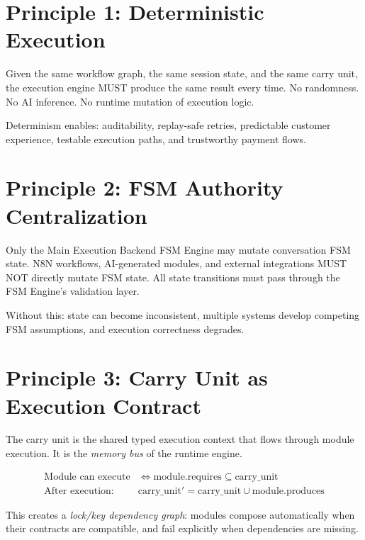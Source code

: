 \documentclass[12pt, a4paper]{report}
\newenvironment{invariantbox}[1]{%
  \begin{tcolorbox}[
    colback=red!4!white,
    colframe=warningred,
    title={\textbf{INVARIANT: #1}},
    fonttitle=\small\bfseries
  ]
}{%
  \end{tcolorbox}
}
\newenvironment{principlebox}[1]{%
  \begin{tcolorbox}[
    colback=blue!4!white,
    colframe=primaryblue,
    title={\textbf{PRINCIPLE: #1}},
    fonttitle=\small\bfseries
  ]
}{%
  \end{tcolorbox}
}
\begin{document}
\section{Principle 1: Deterministic Execution}

\begin{principlebox}{Determinism}
Given the same workflow graph, the same session state, and the same carry unit, the execution engine MUST produce the same result every time. No randomness. No AI inference. No runtime mutation of execution logic.
\end{principlebox}

Determinism enables: auditability, replay-safe retries, predictable customer experience, testable execution paths, and trustworthy payment flows.

\section{Principle 2: FSM Authority Centralization}

\begin{invariantbox}{FSM Authority}
Only the Main Execution Backend FSM Engine may mutate conversation FSM state. N8N workflows, AI-generated modules, and external integrations MUST NOT directly mutate FSM state. All state transitions must pass through the FSM Engine's validation layer.
\end{invariantbox}

Without this: state can become inconsistent, multiple systems develop competing FSM assumptions, and execution correctness degrades.

\section{Principle 3: Carry Unit as Execution Contract}

The carry unit is the shared typed execution context that flows through module execution. It is the \textit{memory bus} of the runtime engine.

\begin{align}
\text{Module can execute} &\iff \text{module.requires} \subseteq \text{carry\_unit} \\
\text{After execution:} \quad & \text{carry\_unit}' = \text{carry\_unit} \cup \text{module.produces}
\end{align}

This creates a \textit{lock/key dependency graph}: modules compose automatically when their contracts are compatible, and fail explicitly when dependencies are missing.
\end{document}
